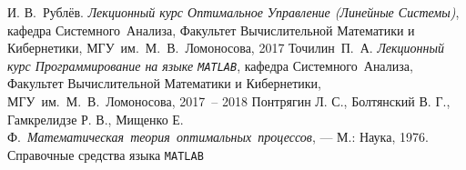 \documentclass[11pt, oneside, final]{article}
\theoremstyle{break}
\numberwithin{equation}{section}
\theoremstyle{plain}
\theoremstyle{definition}
\begin{document}
    \begin{thebibliography}{0}
         И. В.~Рублёв. \emph{Лекционный курс Оптимальное Управление (Линейные Системы)},
        кафедра Системного~Анализа, Факультет Вычислительной Математики и Кибернетики, МГУ~им.~М.~В.~Ломоносова, 
        2017
         Точилин~П.~А. \emph{Лекционный курс Программирование на языке \texttt{MATLAB}},
        кафедра Системного~Анализа, Факультет Вычислительной Математики и Кибернетики, МГУ~им.~М.~В.~Ломоносова, 
        2017~-- 2018
         Понтрягин Л. С., Болтянский В. Г., Гамкрелидзе Р. В., Мищенко Е. Ф.~\emph{Математическая~теория~оптимальных~процессов}, — М.: Наука, 1976.
         Справочные средства языка \texttt{MATLAB}
    \end{thebibliography}
\end{document}
